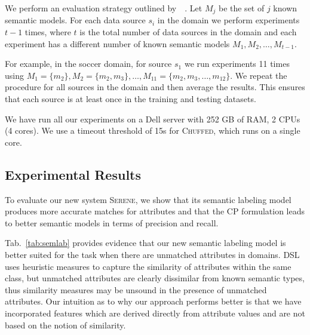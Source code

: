 \documentclass[letterpaper]{article} %
\newcommand{\authornote}[3]{
  {\fbox{\sc 
  #1}:$\blacktriangleright$\textcolor{#2}{\small{#3}}$\blacktriangleleft$}%
}
\newcommand{\npr}[1]{\authornote{NPR}{orange}{#1}}
\newcommand{\chuffed}{\textsc{Chuffed}}
\newcommand{\serene}{\textsc{Serene}}
\newcommand{\ignore}[1]{}
\newcommand{\forijcai}[1]{}
\newcommand{\citeasnoun}[1]{\citeauthor{#1}~\shortcite{#1}}
\begin{document}
We perform an evaluation strategy outlined by~\citeasnoun{taheriyan2016learning}.
Let $M_j$ be the set of $j$ known semantic models.
For each data source $s_i$ in the domain we perform experiments $t-1$ times,
where $t$ is the total number of data sources in the domain and each experiment has a different number of known semantic models $M_1, M_2, \ldots, M_{t-1}$.
\forijcai{The case with $M_{t-1}$ known semantic models corresponds to leave-one-out validation strategy.} 
For example, in the soccer domain, for source $s_1$ we run experiments 11 times using $M_1=\{m_2\}, M_2=\{m_2, m_3\}, \ldots, M_{11}=\{m_2, m_3, \ldots, m_{12}\}$.
We repeat the procedure for all sources in the domain and then average the results.
This \forijcai{procedure} ensures that each source is at least once in the training and testing datasets.


We have run all our experiments on a Dell server with 252 GB of RAM, 2 CPUs (4 cores).
We use a timeout threshold of 15s for \chuffed{}, which 
runs on a single core.

\subsection{Experimental Results}

To evaluate our new system \serene{}, we show that its semantic labeling model 
produces more accurate matches for attributes and that the CP formulation leads 
to better semantic models in terms of precision and recall.

\ignore{We have developed a new approach for semantic labeling which can 
efficiently handle the \emph{unknown} class.}
\ignore{We demonstrate its efficiency by comparing against the state-of-the-art 
approach DSL~\cite{Pham:semantic}. } %
Tab.~\ref{tab:semlab} provides evidence that our new semantic labeling model is better suited for the task when there are unmatched attributes in domains.
DSL uses heuristic measures to capture the similarity of attributes within the same class, but 
unmatched attributes are clearly dissimilar from known semantic types, thus similarity measures may be unsound in the presence of unmatched attributes.
Our intuition as to why our approach performs better is that we have 
incorporated features which are derived directly from attribute values and are 
not based on the notion of similarity.
\end{document}
